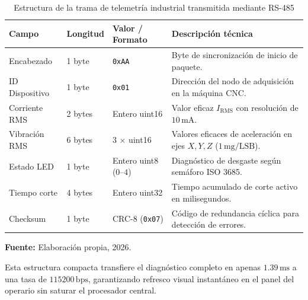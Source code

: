 \begin{table}[H]
\centering
\caption{Estructura de la trama de telemetría industrial transmitida mediante RS-485}\label{tab:estructura_trama_rs485}
\vspace{2mm}
\small
\begin{tabular}{p{2.0cm}p{2.2cm}p{2.6cm}p{6.4cm}}
\hline
\textbf{Campo} & \textbf{Longitud} & \textbf{Valor / Formato} & \textbf{Descripción técnica} \\ \hline \hline
Encabezado & 1 byte & \texttt{0xAA} & Byte de sincronización de inicio de paquete. \\ \hline
ID Dispositivo & 1 byte & \texttt{0x01} & Dirección del nodo de adquisición en la máquina CNC. \\ \hline
Corriente RMS & 2 bytes & Entero uint16 & Valor eficaz $I_{\text{RMS}}$ con resolución de $10\,\text{mA}$. \\ \hline
Vibración RMS & 6 bytes & 3 $\times$ uint16 & Valores eficaces de aceleración en ejes $X, Y, Z$ ($1\,\text{mg/LSB}$). \\ \hline
Estado LED & 1 byte & Entero uint8 ($0\text{--}4$) & Diagnóstico de desgaste según semáforo ISO 3685. \\ \hline
Tiempo corte & 4 bytes & Entero uint32 & Tiempo acumulado de corte activo en milisegundos. \\ \hline
Checksum & 1 byte & CRC-8 (\texttt{0x07}) & Código de redundancia cíclica para detección de errores. \\ \hline
\end{tabular}
\par\vspace{2mm}
\footnotesize \textbf{Fuente:} Elaboración propia, 2026.
\end{table}

Esta estructura compacta transfiere el diagnóstico completo en apenas $1.39\,\text{ms}$ a una tasa de $115200\,\text{bps}$, garantizando refresco visual instantáneo en el panel del operario sin saturar el procesador central.

